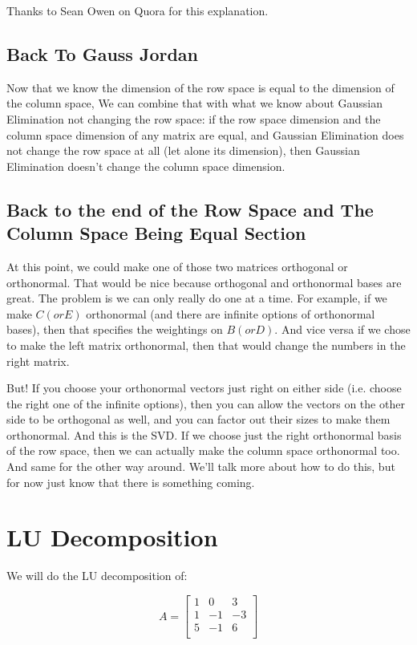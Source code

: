 \documentclass{article}
\begin{document}
Thanks to Sean Owen on Quora for this explanation.

\subsection{Back To Gauss Jordan}

Now that we know the dimension of the row space is equal to the dimension of the column space, We can combine that with what we know about Gaussian Elimination not changing the row space: if the row space dimension and the column space dimension of any matrix are equal, and Gaussian Elimination does not change the row space at all (let alone its dimension), then Gaussian Elimination doesn't change the column space dimension.

\subsection{Back to the end of the Row Space and The Column Space Being Equal Section}

At this point, we could make one of those two matrices orthogonal or orthonormal. That would be nice because orthogonal and orthonormal bases are great. The problem is we can only really do one at a time. For example, if we make $C (or E)$ orthonormal (and there are infinite options of orthonormal bases), then that specifies the weightings on $B (or D)$.  And vice versa if we chose to make the left matrix orthonormal, then that would change the numbers in the right matrix. 

But! If you choose your orthonormal vectors just right on either side (i.e. choose the right one of the infinite options), then you can allow the vectors on the other side to be orthogonal as well, and you can factor out their sizes to make them orthonormal. And this is the SVD.  If we choose just the right orthonormal basis of the row space, then we can actually make the column space orthonormal too.  And same for the other way around. We'll talk more about how to do this, but for now just know that there is something coming.

\section{LU Decomposition}

We will do the LU decomposition of:

$$A = \begin{bmatrix}
  1  & 0 & 3 \\
   1 & -1 & -3 \\
  5  & -1 & 6 \\
   \end{bmatrix}
$$
\end{document}
